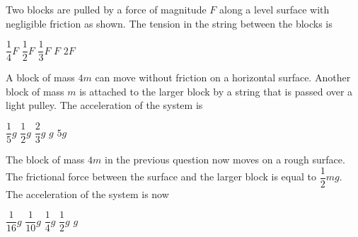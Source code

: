 \documentclass{../../../oss-ap12ibhl-print}
\begin{document}
\begin{questions}

  \question Two blocks are pulled by a force of magnitude $F$ along a level
  surface with negligible friction as shown. The tension in the string between
  the blocks is
  \begin{choices}
    \choice $\dfrac14F$
    \choice $\dfrac12F$
    \choice $\dfrac13F$
    \choice $F$
    \choice $2F$
  \end{choices}
  
  \question A block of mass $4m$ can move without friction on a horizontal
  surface. Another block of mass $m$ is attached to the larger block by a
  string that is passed over a light pulley. The acceleration of the system is
  \begin{choices}
    \choice $\dfrac15g$
    \choice $\dfrac12g$
    \choice $\dfrac23g$
    \choice $g$
    \choice $5g$
  \end{choices}

  \question The block of mass $4m$ in the previous question now moves on a rough
  surface. The frictional force between the surface and the larger block is
  equal to $\dfrac12mg$. The acceleration of the system is now
  \begin{choices}
    \choice $\dfrac1{16}g$
    \choice $\dfrac1{10}g$
    \choice $\dfrac1{4}g$
    \choice $\dfrac1{2}g$
    \choice $g$
  \end{choices}
    
  \newpage
  

\end{questions}
\end{document}
